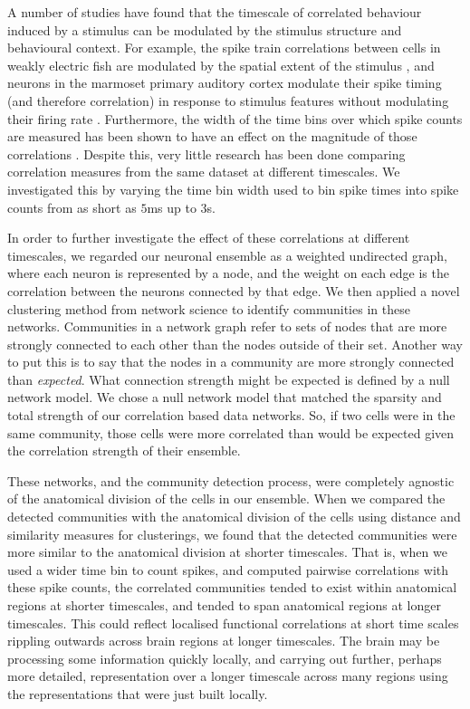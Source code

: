 A number of studies have found that the timescale of correlated behaviour induced by a stimulus can be modulated by the stimulus structure and behavioural context. For example, the spike train correlations between cells in weakly electric fish are modulated by the spatial extent of the stimulus \parencite{litwinkumar}, and neurons in the marmoset primary auditory cortex modulate their spike timing (and therefore correlation) in response to stimulus features without modulating their firing rate  \parencite{decharms}. Furthermore, the width of the time bins over which spike counts are measured has been shown to have an effect on the magnitude of those correlations \parencite{cohen2}. Despite this, very little research has been done comparing correlation measures from the same dataset at different timescales. We investigated this by varying the time bin width used to bin spike times into spike counts from as short as $5$ms up to $3$s.

In order to further investigate the effect of these correlations at different timescales, we regarded our neuronal ensemble as a weighted undirected graph, where each neuron is represented by a node, and the weight on each edge is the correlation between the neurons connected by that edge. We then applied a novel clustering method from network science \parencite{humphries} to identify communities in these networks. Communities in a network graph refer to sets of nodes that are more strongly connected to each other than the nodes outside of their set. Another way to put this is to say that the nodes in a community are more strongly connected than \textit{expected}. What connection strength might be expected is defined by a null network model. We chose a null network model that matched the sparsity and total strength of our correlation based data networks. So, if two cells were in the same community, those cells were more correlated than would be expected given the correlation strength of their ensemble.

These networks, and the community detection process, were completely agnostic of the anatomical division of the cells in our ensemble. When we compared the detected communities with the anatomical division of the cells using distance and similarity measures for clusterings, we found that the detected communities were more similar to the anatomical division at shorter timescales. That is, when we used a wider time bin to count spikes, and computed pairwise correlations with these spike counts, the correlated communities tended to exist within anatomical regions at shorter timescales, and tended to span anatomical regions at longer timescales. This could reflect localised functional correlations at short time scales rippling outwards across brain regions at longer timescales. The brain may be processing some information quickly locally, and carrying out further, perhaps more detailed, representation over a longer timescale across many regions using the representations that were just built locally.

